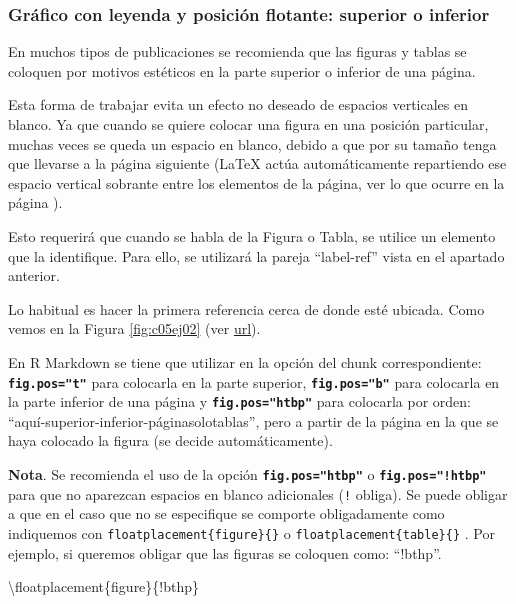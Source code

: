 \documentclass[12pt,a4paper,oneside,]{book}
\newenvironment{Shaded}{\begin{snugshade}}{\end{snugshade}}
\newcommand{\FunctionTok}[1]{\textcolor[rgb]{0.00,0.00,0.00}{#1}}
\newcommand{\NormalTok}[1]{#1}
\numberwithin{dummy}{section}
\theoremstyle{ocrenumbox}
\theoremstyle{blacknumex}
\theoremstyle{blacknumbox}
\theoremstyle{ocrenum}
\theoremstyle{ocrenum}
\begin{document}
\hypertarget{gruxe1fico-con-leyenda-y-posiciuxf3n-flotante-superior-o-inferior}{%
\subsubsection{Gráfico con leyenda y posición flotante: superior o
inferior}\label{gruxe1fico-con-leyenda-y-posiciuxf3n-flotante-superior-o-inferior}}

En muchos tipos de publicaciones se recomienda que las figuras y tablas
se coloquen por motivos estéticos en la parte superior o inferior de una
página.

Esta forma de trabajar evita un efecto no deseado de espacios verticales
en blanco. Ya que cuando se quiere colocar una figura en una posición
particular, muchas veces se queda un espacio en blanco, debido a que por
su tamaño tenga que llevarse a la página siguiente (LaTeX actúa
automáticamente repartiendo ese espacio vertical sobrante entre los
elementos de la página, ver lo que ocurre en la página
\pageref{sec:incluirgrafico}).

Esto requerirá que cuando se habla de la Figura o Tabla, se utilice un
elemento que la identifique. Para ello, se utilizará la pareja
``label-ref'' vista en el apartado anterior.

Lo habitual es hacer la primera referencia cerca de donde esté ubicada.
Como vemos en la Figura \ref{fig:c05ej02} (ver
\href{https://resource-cms.springernature.com/springer-cms/rest/v1/content/19112/data/v5}{url}).

En R Markdown se tiene que utilizar en la opción del chunk
correspondiente: \textbf{\texttt{fig.pos="t"}} para colocarla en la
parte superior, \textbf{\texttt{fig.pos="b"}} para colocarla en la parte
inferior de una página y \textbf{\texttt{fig.pos="htbp"}} para colocarla
por orden: ``aquí-superior-inferior-páginasolotablas'', pero a partir de
la página en la que se haya colocado la figura (se decide
automáticamente).

\textbf{Nota}. Se recomienda el uso de la opción
\textbf{\texttt{fig.pos="htbp"}} o \textbf{\texttt{fig.pos="!htbp"}}
para que no aparezcan espacios en blanco adicionales (\texttt{!}
obliga). Se puede obligar a que en el caso que no se especifique se
comporte obligadamente como indiquemos con
\texttt{floatplacement\{figure\}\{\}} o
\texttt{floatplacement\{table\}\{\}} . Por ejemplo, si queremos obligar
que las figuras se coloquen como: ``!bthp''.

\begin{Shaded}
\begin{Highlighting}[]
\FunctionTok{\textbackslash{}floatplacement}\NormalTok{\{figure\}\{!bthp\}}
\end{Highlighting}
\end{Shaded}
\end{document}
